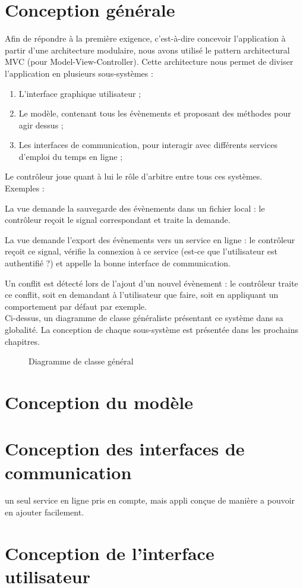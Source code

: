 \chapter{Conception générale}
	Afin de répondre à la première exigence, c'est-à-dire concevoir l'application à partir d'une architecture modulaire, nous avons utilisé le pattern architectural MVC (pour Model-View-Controller). Cette architecture nous permet de diviser l'application en plusieurs sous-systèmes :
	\begin{enumerate}
		\item L'interface graphique utilisateur ;
		\item Le modèle, contenant tous les évènements et proposant des méthodes pour agir dessus ;
		\item Les interfaces de communication, pour interagir avec différents services d'emploi du temps en ligne ;
	\end{enumerate}
	Le contrôleur joue quant à lui le rôle d'arbitre entre tous ces systèmes.\\
	Exemples :
	
	La vue demande la sauvegarde des évènements dans un fichier local : le contrôleur reçoit le signal correspondant et traite la demande.
	
	La vue demande l'export des évènements vers un service en ligne : le contrôleur reçoit ce signal, vérifie la connexion à ce service (est-ce que l'utilisateur est authentifié ?) et appelle la bonne interface de communication.
	
	Un conflit est détecté lors de l'ajout d'un nouvel évènement : le contrôleur traite ce conflit, soit en demandant à l'utilisateur que faire, soit en appliquant un comportement par défaut par exemple.\\
	
	Ci-dessus, un diagramme de classe généraliste présentant ce système dans sa globalité. La conception de chaque sous-système est présentée dans les prochains chapitres.
	\begin{figure}
		\centering
		\caption{Diagramme de classe général}
	\end{figure}
	\FloatBarrier

\chapter{Conception du modèle}

\chapter{Conception des interfaces de communication}
	un seul service en ligne pris en compte, mais appli conçue de manière a pouvoir en ajouter facilement.

\chapter{Conception de l'interface utilisateur}

